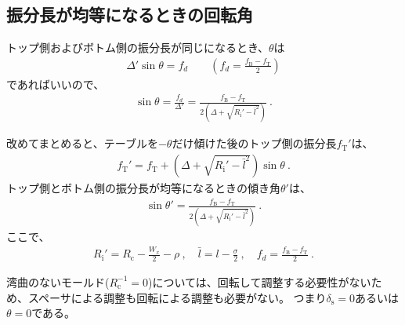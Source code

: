 \subsection{振分長が均等になるときの回転角}
トップ側およびボトム側の振分長が同じになるとき、$\theta$は
\begin{align*}
  \varDelta'\sin\theta = f_d \qquad \left(f_d = \frac{f_\mathrm B-f_\mathrm T}2\right)
\end{align*}
であればいいので、
\begin{align}
  \label{eq:saifuriwakeangle}
  \sin\theta = \frac{f_d}{\varDelta'}
  = \frac{f_\mathrm B-f_\mathrm T}{2\left(\varDelta+\sqrt{R_\mathrm i'-\bar l^2}\right)}~.
\end{align}
\begin{hosoku}
改めてまとめると、テーブルを$-\theta$だけ傾けた後のトップ側の振分長$f_\mathrm T'$は、
\begin{align*}
  f_\mathrm T' = f_\mathrm T+\left(\varDelta+\sqrt{R_\mathrm i'-\bar l^2}\right)\sin\theta\ .
\end{align*}
トップ側とボトム側の振分長が均等になるときの傾き角$\theta'$は、
\begin{align*}
  \sin\theta' = \frac{f_\mathrm B-f_\mathrm T}{2\left(\varDelta+\sqrt{R_\mathrm i'-\bar l^2}\right)}\ .
\end{align*}
ここで、
\begin{align*}
  R_\mathrm i' = R_\mathrm c-\frac{W_x}2-\rho\ ,\quad
  \bar l = l-\frac\sigma2\ ,\quad
  f_d = \frac{f_\mathrm B-f_\mathrm T}2\ .
\end{align*}
\end{hosoku}



湾曲のないモールド($R_\mathrm c^{-1}= 0$)については、回転して調整する必要性がないため、スペーサによる調整も回転による調整も必要がない。
つまり$\delta_\mathrm s = 0$あるいは$\theta = 0$である。

